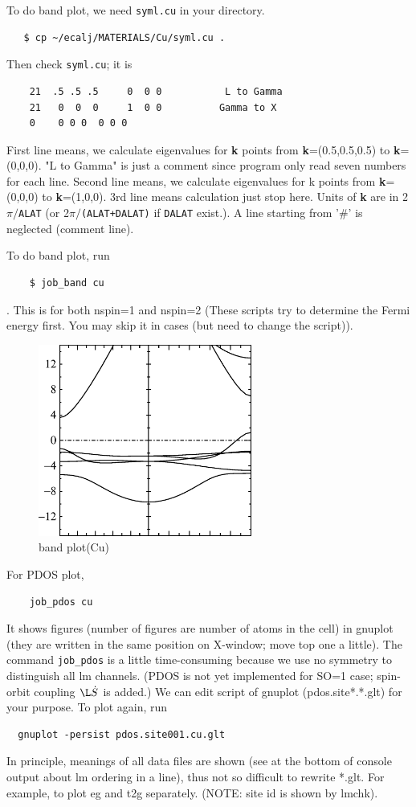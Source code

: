 \documentclass[a4paper,10pt,epsf,fleqn]{article}
\begin{document}
To do band plot, we need \verb+syml.cu+ in your directory.
\begin{verbatim}
   $ cp ~/ecalj/MATERIALS/Cu/syml.cu .
\end{verbatim}
Then check \verb+syml.cu+; it is
\begin{verbatim}
    21  .5 .5 .5     0  0 0           L to Gamma
    21   0  0  0     1  0 0          Gamma to X
    0    0 0 0  0 0 0
\end{verbatim}
First line means, we calculate eigenvalues 
for {\bf k} points from {\bf k}=(0.5,0.5,0.5) to {\bf k}=(0,0,0).
"L to Gamma" is just a comment since program only read 
seven numbers for each line.
Second line means, we calculate eigenvalues 
for k points from {\bf k}=(0,0,0) to {\bf k}=(1,0,0).
3rd line means calculation just stop here.
Units of {\bf k} are in 2$\pi/$\verb+ALAT+ (or 2$\pi/$\verb#(ALAT+DALAT)#
if \verb+DALAT+ exist.).
A line starting from '\#' is neglected (comment line).

To do band plot, run
\begin{verbatim}
    $ job_band cu
\end{verbatim}
. This is for both nspin=1 and nspin=2
(These scripts try to determine the Fermi energy first. You may skip it
in cases (but need to change the script)).

\begin{figure}[h]
 \begin{center}
  \includegraphics[width=70mm]{img/bandcu.eps}
  \caption{band plot(Cu)}
 \end{center}
\end{figure}

For PDOS plot,
\begin{verbatim}
    job_pdos cu
\end{verbatim}
It shows figures (number of figures are number of atoms in the cell) in
gnuplot (they are written in the same position on X-window;
move top one a little). The command \verb+job_pdos+ is a little 
time-consuming because we use no symmetry to distinguish all lm channels.
(PDOS is not yet implemented for SO=1 case; spin-orbit coupling $\L\dot S$ is added.)
We can edit script of gnuplot (pdos.site*.*.glt) for your purpose.
To plot again, run
\begin{verbatim}
  gnuplot -persist pdos.site001.cu.glt
\end{verbatim}
In principle, meanings of all data files are shown (see at the bottom
of console output about lm ordering in a line), thus not so difficult to
rewrite *.glt. For example, to plot eg and t2g separately. 
(NOTE: site id is shown by lmchk).\\
\end{document}

